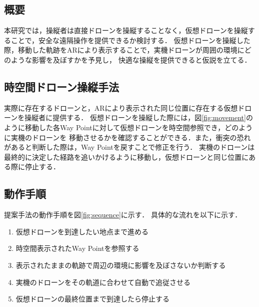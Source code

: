 \documentclass[a4paper,10pt,twocolumn,uplatex]{jsarticle}
\begin{document}
\subsection{概要}
本研究では，操縦者は直接ドローンを操縦することなく，仮想ドローンを操縦することで，安全な遠隔操作を提供できるか検討する．
仮想ドローンを操縦した際，移動した軌跡をARにより表示することで，実機ドローンが周囲の環境にどのような影響を及ぼすかを予見し，
快適な操縦を提供できると仮説を立てる．


\subsection{時空間ドローン操縦手法}
実際に存在するドローンと，ARにより表示された同じ位置に存在する仮想ドローンを操縦者に提供する．
仮想ドローンを操縦した際には，図\ref{fig:movement}のように移動した各Way Pointに対して仮想ドローンを時空間参照でき，どのように実機のドローンを
移動させるかを確認することができる．また，衝突の恐れがあると判断した際は，Way Pointを戻すことで修正を行う．
実機のドローンは最終的に決定した経路を追いかけるように移動し，仮想ドローンと同じ位置にある際に停止する．



\subsection{動作手順}
提案手法の動作手順を図\ref{fig:sequence}に示す．
具体的な流れを以下に示す．
\begin{enumerate}
  \item 仮想ドローンを到達したい地点まで進める
  \item 時空間表示されたWay Pointを参照する
  \item 表示されたままの軌跡で周辺の環境に影響を及ぼさないか判断する
  \item 実機のドローンをその軌道に合わせて自動で追従させる
  \item 仮想ドローンの最終位置まで到達したら停止する
\end{enumerate}

\end{document}
